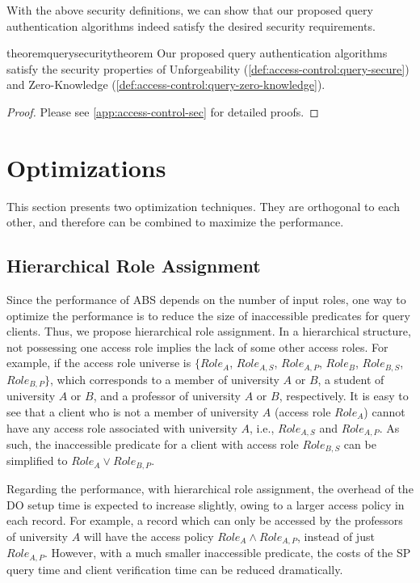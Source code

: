 With the above security definitions, we can show that our proposed query authentication algorithms indeed satisfy the desired security requirements.

\begin{restatable}{theorem}{querysecuritytheorem}\label{thm:access-control:sec}
  Our proposed query authentication algorithms satisfy the security properties of Unforgeability (\cref{def:access-control:query-secure}) and Zero-Knowledge (\cref{def:access-control:query-zero-knowledge}).
\end{restatable}

\begin{proof}
  Please see \cref{app:access-control-sec} for detailed proofs.
\end{proof}

\section{Optimizations}\label{sec:access-control:opt}

This section presents two optimization techniques. They are orthogonal to each other, and therefore can be combined to maximize the performance.

\subsection{Hierarchical Role Assignment}
Since the performance of ABS depends on the number of input roles, one way to optimize the performance is to reduce the size of inaccessible predicates for query clients. Thus, we propose hierarchical role assignment. In a hierarchical structure, not possessing one access role implies the lack of some other access roles. For example, if the access role universe is $\{{Role}_A$, ${Role}_{A,S}$, ${Role}_{A,P}$, ${Role}_B$, ${Role}_{B,S}$, ${Role}_{B,P}\}$, which corresponds to a member of university $A$ or $B$, a student of university $A$ or $B$, and a professor of university $A$ or $B$, respectively. It is easy to see that a client who is not a member of university $A$ (access role ${Role}_A$) cannot have any access role associated with university $A$, i.e., ${Role}_{A,S}$ and ${Role}_{A,P}$. As such, the inaccessible predicate for a client with access role ${Role}_{B,S}$ can be simplified to ${Role}_A \lor {Role}_{B,P}$.

Regarding the performance, with hierarchical role assignment, the overhead of the DO setup time is expected to increase slightly, owing to a larger access policy in each record. For example, a record which can only be accessed by the professors of university $A$ will have the access policy ${Role}_{A} \land {Role}_{A,P}$, instead of just ${Role}_{A,P}$.
However, with a much smaller inaccessible predicate, the costs of the SP query time and client verification time can be reduced dramatically.

